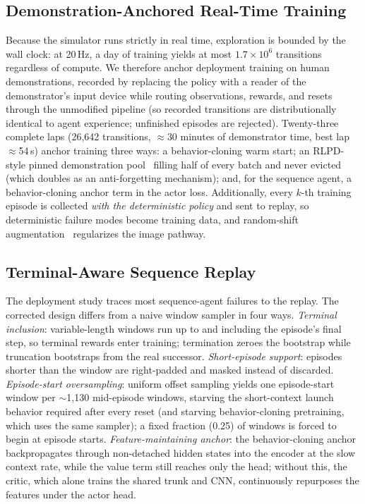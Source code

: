 \documentclass[conference]{IEEEtran}
\begin{document}
\subsection{Demonstration-Anchored Real-Time Training}
\label{sec:demos}
Because the simulator runs strictly in real time, exploration is bounded by the wall clock: at 20\,Hz, a day of training yields at most $1.7 \times 10^6$ transitions regardless of compute. We therefore anchor deployment training on human demonstrations, recorded by replacing the policy with a reader of the demonstrator's input device while routing observations, rewards, and resets through the unmodified pipeline (so recorded transitions are distributionally identical to agent experience; unfinished episodes are rejected). Twenty-three complete laps (26{,}642 transitions, $\approx$30 minutes of demonstrator time, best lap $\approx$54\,s) anchor training three ways: a behavior-cloning warm start; an RLPD-style pinned demonstration pool~\cite{rlpd} filling half of every batch and never evicted (which doubles as an anti-forgetting mechanism); and, for the sequence agent, a behavior-cloning anchor term in the actor loss. Additionally, every $k$-th training episode is collected \emph{with the deterministic policy} and sent to replay, so deterministic failure modes become training data, and random-shift augmentation~\cite{drq} regularizes the image pathway.

\subsection{Terminal-Aware Sequence Replay}
\label{sec:seqreplay}
The deployment study traces most sequence-agent failures to the replay. The corrected design differs from a naive window sampler in four ways. \emph{Terminal inclusion}: variable-length windows run up to and including the episode's final step, so terminal rewards enter training; termination zeroes the bootstrap while truncation bootstraps from the real successor. \emph{Short-episode support}: episodes shorter than the window are right-padded and masked instead of discarded. \emph{Episode-start oversampling}: uniform offset sampling yields one episode-start window per $\sim$1{,}130 mid-episode windows, starving the short-context launch behavior required after every reset (and starving behavior-cloning pretraining, which uses the same sampler); a fixed fraction (0.25) of windows is forced to begin at episode starts. \emph{Feature-maintaining anchor}: the behavior-cloning anchor backpropagates through non-detached hidden states into the encoder at the slow context rate, while the value term still reaches only the head; without this, the critic, which alone trains the shared trunk and CNN, continuously repurposes the features under the actor head.
\end{document}
